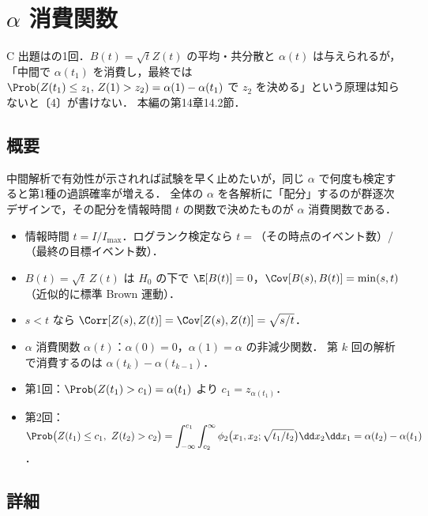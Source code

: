 \chapter{\texorpdfstring{$\alpha$}{α} 消費関数}\label{ch:m09}

\begin{priobox}{C}
出題はの1回．$B(t)=\sqrt tZ(t)$ の平均・共分散と $\alpha(t)$ は与えられるが，
「中間で $\alpha(t_1)$ を消費し，最終では $\Prob(Z(t_1)\le z_1,\,Z(1)>z_2)=\alpha(1)-\alpha(t_1)$ で $z_2$ を決める」という原理は知らないと〔4〕が書けない．
本編の第14章14.2節．
\end{priobox}

\section{概要}\label{sec:m09-gaiyo}
中間解析で有効性が示されれば試験を早く止めたいが，同じ $\alpha$ で何度も検定すると第1種の過誤確率が増える．
全体の $\alpha$ を各解析に「配分」するのが群逐次デザインで，その配分を情報時間 $t$ の関数で決めたものが $\alpha$ 消費関数である．
\begin{pointbox}[覚える式]
\begin{itemize}
\item 情報時間 $t=I/I_{\max}$．ログランク検定なら $t=$（その時点のイベント数）/（最終の目標イベント数）．
\item $B(t)=\sqrt t\,Z(t)$ は $H_0$ の下で $\E[B(t)]=0$，$\Cov[B(s),B(t)]=\min(s,t)$（近似的に標準 Brown 運動）．
\item $s<t$ なら $\Corr[Z(s),Z(t)]=\Cov[Z(s),Z(t)]=\sqrt{s/t}$．
\item $\alpha$ 消費関数 $\alpha(t)$：$\alpha(0)=0$，$\alpha(1)=\alpha$ の非減少関数．
      第 $k$ 回の解析で消費するのは $\alpha(t_k)-\alpha(t_{k-1})$．
\item 第1回：$\Prob(Z(t_1)>c_1)=\alpha(t_1)$ より $c_1=z_{\alpha(t_1)}$．
\item 第2回：$\Prob\bigl(Z(t_1)\le c_1,\ Z(t_2)>c_2\bigr)=\displaystyle\int_{-\infty}^{c_1}\int_{c_2}^{\infty}\phi_2\bigl(x_1,x_2;\sqrt{t_1/t_2}\bigr)\dd x_2\dd x_1=\alpha(t_2)-\alpha(t_1)$．
\end{itemize}
\end{pointbox}

\section{詳細}\label{sec:m09-shosai}
